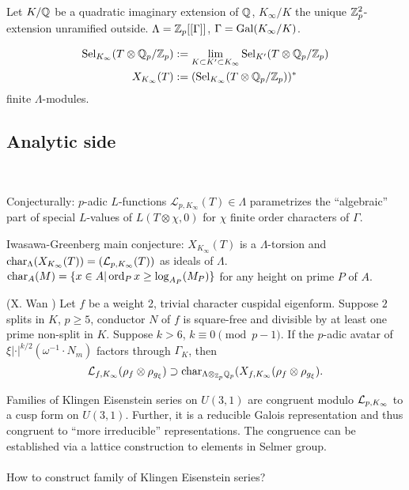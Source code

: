 \documentclass[12pt,amsfont]{amsart}
\begin{document}
Let $K/{\mathbb Q}$ be a quadratic imaginary extension of ${\mathbb Q}$, $K_\infty/K$ the unique ${\mathbb Z}_p^2$-extension unramified outside. $\Lambda = {\mathbb Z}_p[[\Gamma]]$, $\Gamma = \operatorname{Gal}(K_\infty/K)$. 

\begin{dfn} 
\begin{align*}
\operatorname{Sel}_{K_\infty}(T \otimes {\mathbb Q}_p/{\mathbb Z}_p) &:= \lim_{K \subset K' \subset K_\infty} \operatorname{Sel}_{K'}(T \otimes {\mathbb Q}_p/{\mathbb Z}_p) \\
X_{K_\infty}(T) &:= (\operatorname{Sel}_{K_\infty}(T \otimes {\mathbb Q}_p/{\mathbb Z}_p))^\ast\end{align*}
finite $\Lambda$-modules.
\end{dfn}

\subsection{Analytic side}
{\ }

Conjecturally: $p$-adic $L$-functions $\mathcal{L}_{p, K_\infty}(T) \in \Lambda$ parametrizes the ``algebraic'' part of special $L$-values of $L(T \otimes \chi, 0)$ for $\chi$ finite order characters of $\Gamma$.
\begin{cnj}
Iwasawa-Greenberg main conjecture: $X_{K_\infty}(T)$ is a $\Lambda$-torsion and $\operatorname{char}_\Lambda(X_{K_\infty}(T)) = \left(\mathcal{L}_{p, K_\infty}(T)\right)$ as ideals of $\Lambda$. $\operatorname{char}_A(M) = \{x \in A | \operatorname{ord}_P x \geq \log_{A_P}(M_P)\}$ for any height on prime $P$ of $A$. 
\end{cnj}
\begin{thm} (X. Wan ) Let $f$ be a weight 2, trivial character cuspidal eigenform. Suppose $2$ splits in $K$, $p \geq 5$, conductor $N$ of $f$ is square-free and divisible by at least one prime non-split in $K$. Suppose $k > 6$, $k \equiv 0 \pmod{p-1}$. If the $p$-adic avatar of $\xi \lvert \cdot \rvert^{k/2} (\omega^{-1} \cdot N_m)$ factors through $\Gamma_K$, then
\[\mathcal{L}_{f, K_\infty}(\rho_f \otimes \rho_{g_\xi}) \supset \operatorname{char}_{\Lambda \otimes_{{\mathbb Z}_p} {\mathbb Q}_p} (X_{f, K_\infty} (\rho_f \otimes \rho_{g_\xi}). \]
\end{thm}

Families of Klingen Eisenstein series on $U(3,1)$ are congruent modulo $\mathcal{L}_{p, K_\infty}$ to a cusp form on $U(3,1)$. Further, it is a reducible Galois representation and thus congruent to ``more irreducible'' representations. The congruence can be established via a lattice construction to elements in Selmer group. \\ \\
How to construct family of Klingen Eisenstein series?
\end{document}
